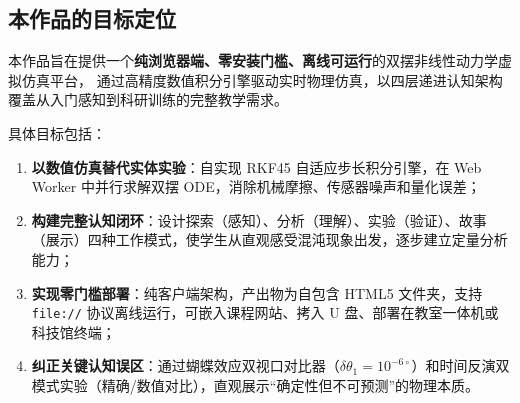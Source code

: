 \subsection{本作品的目标定位}

本作品旨在提供一个\textbf{纯浏览器端、零安装门槛、离线可运行}的双摆非线性动力学虚拟仿真平台，
通过高精度数值积分引擎驱动实时物理仿真，以四层递进认知架构覆盖从入门感知到科研训练的完整教学需求。

具体目标包括：
\begin{enumerate}[label=(\arabic*), leftmargin=*]
  \item \textbf{以数值仿真替代实体实验}：自实现 RKF45 自适应步长积分引擎，在 Web Worker 中并行求解双摆 ODE，消除机械摩擦、传感器噪声和量化误差；
  \item \textbf{构建完整认知闭环}：设计探索（感知）、分析（理解）、实验（验证）、故事（展示）四种工作模式，使学生从直观感受混沌现象出发，逐步建立定量分析能力；
  \item \textbf{实现零门槛部署}：纯客户端架构，产出物为自包含 HTML5 文件夹，支持 \texttt{file://} 协议离线运行，可嵌入课程网站、拷入 U 盘、部署在教室一体机或科技馆终端；
  \item \textbf{纠正关键认知误区}：通过蝴蝶效应双视口对比器（$\delta\theta_1 = 10^{-6\circ}$）和时间反演双模式实验（精确/数值对比），直观展示“确定性但不可预测”的物理本质。
\end{enumerate}

\endinput
